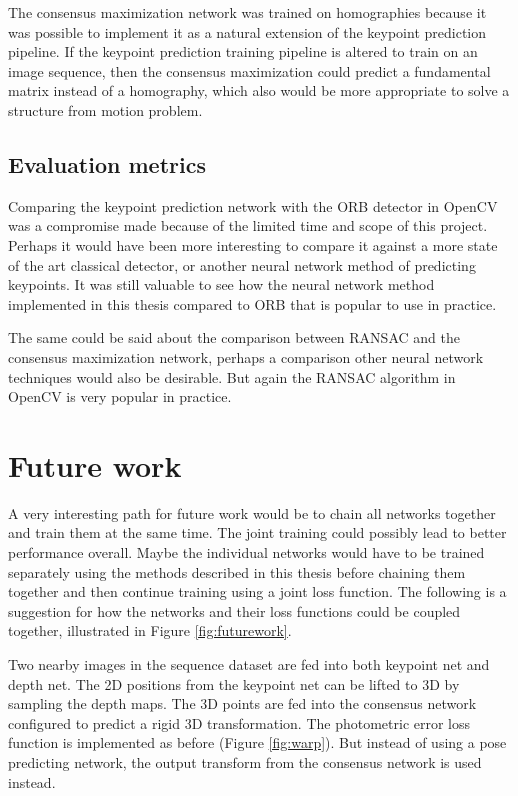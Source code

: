The consensus maximization network was trained on homographies because it was possible to implement it as a natural extension of the keypoint prediction pipeline. If the keypoint prediction training pipeline is altered to train on an image sequence, then the consensus maximization could predict a fundamental matrix instead of a homography, which also would be more appropriate to solve a structure from motion problem.

\subsection{Evaluation metrics}

Comparing the keypoint prediction network with the ORB detector in OpenCV was a compromise made because of the limited time and scope of this project. Perhaps it would have been more interesting to compare it against a more state of the art classical detector, or another neural network method of predicting keypoints. It was still valuable to see how the neural network method implemented in this thesis compared to ORB that is popular to use in practice.

The same could be said about the comparison between RANSAC and the consensus maximization network, perhaps a comparison other neural network techniques would also be desirable. But again the RANSAC algorithm in OpenCV is very popular in practice.

\section{Future work}

A very interesting path for future work would be to chain all networks together and train them at the same time. The joint training could possibly lead to better performance overall. Maybe the individual networks would have to be trained separately using the methods described in this thesis before chaining them together and then continue training using a joint loss function. The following is a suggestion for how the networks and their loss functions could be coupled together, illustrated in Figure \ref{fig:futurework}.

Two nearby images in the sequence dataset are fed into both keypoint net and depth net. The 2D positions from the keypoint net can be lifted to 3D by sampling the depth maps. The 3D points are fed into the consensus network configured to predict a rigid 3D transformation. The photometric error loss function is implemented as before (Figure \ref{fig:warp}). But instead of using a pose predicting network, the output transform from the consensus network is used instead.

